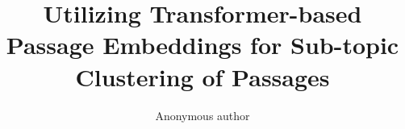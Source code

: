 \documentclass[sigconf,authordraft]{acmart}
\begin{document}
\title{Utilizing Transformer-based Passage Embeddings for Sub-topic Clustering of Passages}


\author{Anonymous author}

\renewcommand{\shortauthors}{}
\maketitle
\end{document}
